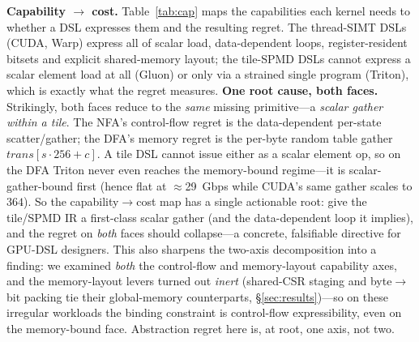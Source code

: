 \documentclass[conference]{IEEEtran}
\begin{document}
\textbf{Capability $\to$ cost.} Table~\ref{tab:cap} maps the capabilities each kernel needs to
whether a DSL expresses them and the resulting regret. The thread-SIMT DSLs (CUDA, Warp)
express all of scalar load, data-dependent loops, register-resident bitsets and explicit
shared-memory layout; the tile-SPMD DSLs cannot express a scalar element load at all (Gluon)
or only via a strained single program (Triton), which is exactly what the regret measures.
\textbf{One root cause, both faces.} Strikingly, both faces reduce to the \emph{same} missing
primitive---a \emph{scalar gather within a tile}. The NFA's control-flow regret is the
data-dependent per-state scatter/gather; the DFA's memory regret is the per-byte random
table gather $\textit{trans}[s\!\cdot\!256+c]$. A tile DSL cannot issue either as a scalar
element op, so on the DFA Triton never even reaches the memory-bound regime---it is
scalar-gather-bound first (hence flat at $\approx$29~Gbps while CUDA's same gather scales to
$364$). So the capability$\to$cost map has a single actionable root: give the tile/SPMD IR a
first-class scalar gather (and the data-dependent loop it implies), and the regret on
\emph{both} faces should collapse---a concrete, falsifiable directive for GPU-DSL designers.
This also sharpens the two-axis decomposition into a finding: we examined \emph{both} the
control-flow and memory-layout capability axes, and the memory-layout levers turned out
\emph{inert} (shared-CSR staging and byte$\to$bit packing tie their global-memory counterparts,
\S\ref{sec:results})---so on these irregular workloads the binding constraint is control-flow
expressibility, even on the memory-bound face. Abstraction regret here is, at root, one axis,
not two.
\end{document}
